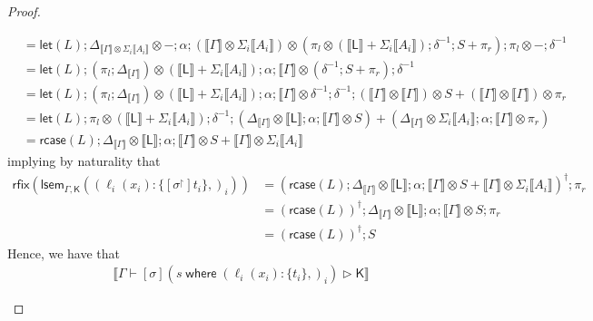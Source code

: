 \documentclass[acmsmall,screen,review]{acmart}
\newcommand{\ms}[1]{\ensuremath{\mathsf{#1}}}
\newcommand{\lto}{:}
\newcommand{\where}[2]{#1\;\ms{where}\;#2}
\newcommand{\wbranch}[3]{#1(#2) \lto \{#3\}}
\newcommand{\rupg}[1]{{#1}^\upharpoonright}
\newcommand{\haslb}[3]{#1 \vdash #2 \rhd #3}
\newcommand{\dnt}[1]{\llbracket{#1}\rrbracket}
\newcommand{\dmor}[1]{{\Delta}_{#1}}
\newcommand{\loopmor}[3]{\ms{lsem}_{#1, #3}(#2)}
\newcommand{\lmor}[1]{\ms{let}(#1)}
\newcommand{\rcase}[1]{\ms{rcase}(#1)}
\newcommand{\rfix}[1]{\ms{rfix}(#1)}
\begin{document}
\begin{proof}
\begin{itemize}[leftmargin=*]
\begin{equation}
\begin{aligned}
        & = \lmor{L}
          ; \dmor{\dnt{\Gamma} \otimes \Sigma_i\dnt{A_i}} \otimes -
          ; \alpha
          ; (\dnt{\Gamma} \otimes \Sigma_i\dnt{A_i}) 
          \otimes (\pi_l \otimes (\dnt{\ms{L}} + \Sigma_i\dnt{A_i}) ; \delta^{-1} ; S + \pi_r)
          ; \pi_l \otimes - ; \delta^{-1} \\
        & = \lmor{L}
          ; (\pi_l ; \dmor{\dnt{\Gamma}}) \otimes (\dnt{\ms{L}} + \Sigma_i\dnt{A_i})
          ; \alpha
          ; \dnt{\Gamma}
          \otimes (\delta^{-1} ; S + \pi_r)
          ; \delta^{-1} \\
        & = \lmor{L}
          ; (\pi_l ; \dmor{\dnt{\Gamma}}) \otimes (\dnt{\ms{L}} + \Sigma_i\dnt{A_i})
          ; \alpha
          ; \dnt{\Gamma}
          \otimes \delta^{-1}
          ; \delta^{-1} 
          ; (\dnt{\Gamma} \otimes \dnt{\Gamma}) \otimes S 
            + (\dnt{\Gamma} \otimes \dnt{\Gamma}) \otimes \pi_r \\
        & = \lmor{L} ; \pi_l \otimes (\dnt{\ms{L}} + \Sigma_i\dnt{A_i})
          ; \delta^{-1}
          ; (\dmor{\dnt{\Gamma}} \otimes \dnt{\ms{L}} ; \alpha ; \dnt{\Gamma} \otimes S) 
          + (\dmor{\dnt{\Gamma}} \otimes \Sigma_i\dnt{A_i}
              ; \alpha ; \dnt{\Gamma} \otimes \pi_r) \\
          & = \rcase{L}
            ; \dmor{\dnt{\Gamma}} \otimes \dnt{\ms{L}} ; \alpha ; \dnt{\Gamma} \otimes S
            + \dnt{\Gamma} \otimes \Sigma_i\dnt{A_i}
      \end{aligned}
    \end{equation}
    implying by naturality that
    \begin{equation}
      \begin{aligned}
        \rfix{\loopmor{\Gamma}{(\wbranch{\ell_i}{x_i}{[\rupg{\sigma}]t_i},)_i}{\ms{K}}}
        & = (\rcase{L}
        ; \dmor{\dnt{\Gamma}} \otimes \dnt{\ms{L}} ; \alpha ; \dnt{\Gamma} \otimes S
            + \dnt{\Gamma} \otimes \Sigma_i\dnt{A_i})^\dagger ; \pi_r \\
        & = (\rcase{L})^\dagger 
          ; \dmor{\dnt{\Gamma}} \otimes \dnt{\ms{L}} ; \alpha ; \dnt{\Gamma} \otimes S ; \pi_r \\
        & = (\rcase{L})^\dagger ; S
      \end{aligned}
    \end{equation}
    Hence, we have that
    \begin{equation}
      \begin{aligned}
        & \dnt{\haslb{\Gamma}{[\sigma](\where{s}{(\wbranch{\ell_i}{x_i}{t_i},)_i})}{\ms{K}}}

\end{aligned}
\end{equation}
\end{itemize}
\end{proof}
\end{document}
